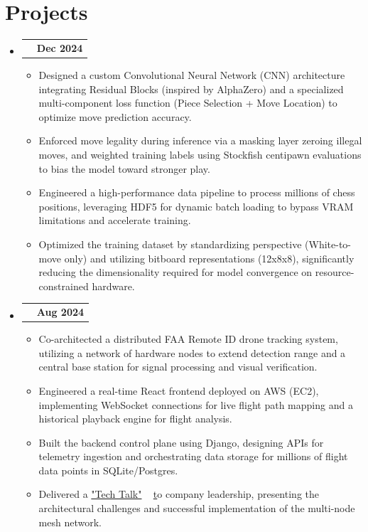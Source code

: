 \documentclass[letterpaper,11pt]{article}
\makeatletter
\newcommand{\resumeItem}[1]{
  \item\small{
    {#1 \vspace{-2pt}}
  }
}
\newcommand{\resumeProjectHeading}[2]{
    \item
    \begin{tabular*}{1.001\textwidth}{l@{\extracolsep{\fill}}r}
      \small#1 & \textbf{\small #2}\\
    \end{tabular*}\vspace{-7pt}
}
\newcommand{\resumeSubHeadingListStart}{\begin{itemize}[leftmargin=0.0in, label={}]}
\newcommand{\resumeSubHeadingListEnd}{\end{itemize}}
\newcommand{\resumeItemListStart}{\begin{itemize}}
\newcommand{\resumeItemListEnd}{\end{itemize}\vspace{-5pt}}
\makeatother
\begin{document}
\section{Projects}
    \vspace{-5pt}
    \resumeSubHeadingListStart
      \resumeProjectHeading
          {\textbf{\underline{Chess Convolutional Neural Network}~\href{https://github.com/jacobghunter/chess-ai/tree/main/cnn}} $|$ \emph{PyTorch}}{Dec 2024}
          \resumeItemListStart
            \resumeItem{Designed a custom Convolutional Neural Network (CNN) architecture integrating Residual Blocks (inspired by AlphaZero) and a specialized multi-component loss function (Piece Selection + Move Location) to optimize move prediction accuracy.}
            \resumeItem{Enforced move legality during inference via a masking layer zeroing illegal moves, and weighted training labels using Stockfish centipawn evaluations to bias the model toward stronger play.}
            \resumeItem{Engineered a high-performance data pipeline to process millions of chess positions, leveraging HDF5 for dynamic batch loading to bypass VRAM limitations and accelerate training.}
            \resumeItem{Optimized the training dataset by standardizing perspective (White-to-move only) and utilizing bitboard representations (12x8x8), significantly reducing the dimensionality required for model convergence on resource-constrained hardware.}
          \resumeItemListEnd 
          \vspace{-13pt}
        \resumeProjectHeading
          {\textbf{\underline{SkySnare}~\href{https://github.com/jacobghunter/SkySnare}}- Rincon Research $|$ \emph{Django, React.js, AWS}}{Aug 2024}
          \resumeItemListStart
            \resumeItem{Co-architected a distributed FAA Remote ID drone tracking system, utilizing a network of hardware nodes to extend detection range and a central base station for signal processing and visual verification.}
            \resumeItem{Engineered a real-time React frontend deployed on AWS (EC2), implementing WebSocket connections for live flight path mapping and a historical playback engine for flight analysis.}
            \resumeItem{Built the backend control plane using Django, designing APIs for telemetry ingestion and orchestrating data storage for millions of flight data points in SQLite/Postgres.}
            \resumeItem{Delivered a \underline{"Tech Talk"} ~ \href{https://github.com/jacobghunter/SkySnare/blob/main/Final_Presentation.pdf} to company leadership, presenting the architectural challenges and successful implementation of the multi-node mesh network.}
          \resumeItemListEnd
          \vspace{-13pt}
    \resumeSubHeadingListEnd
\vspace{-2pt}
\end{document}
